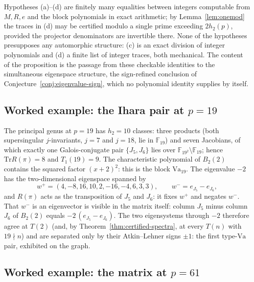 \documentclass[11pt]{amsart}
\theoremstyle{plain}
\theoremstyle{definition}
\newcommand{\F}{\mathbb{F}}
\newcommand{\Tr}{\mathrm{Tr}}
\newcommand{\Va}{\mathrm{Va}}
\providecommand{\Va}{\mathrm{Va}}
\begin{document}
	Hypotheses \textup{(a)}--\textup{(d)} are finitely many equalities between
	integers computable from $M,R,e$ and the block polynomials in exact
	arithmetic; by Lemma~\ref{lem:onemod} the traces in \textup{(d)} may be
	certified modulo a single prime exceeding $2h_2(p)$, provided the
	projector denominators are invertible there. None of the hypotheses
	presupposes any automorphic structure: \textup{(c)} is an exact division
	of integer polynomials and \textup{(d)} a finite list of integer traces,
	both mechanical. The content of the proposition is the passage from these
	checkable identities to the simultaneous eigenspace structure, the
	sign-refined conclusion of Conjecture~\ref{conj:eigenvalue-sign}, which
	no polynomial identity supplies by itself.
	
	\subsection{Worked example: the Ihara pair at $p=19$}
	\label{ss:ihara19}
	
	The principal genus at $p=19$ has $h_2=10$ classes: three products
	(both supersingular $j$-invariants, $j=7$ and $j=18$, lie in $\F_{19}$)
	and seven Jacobians, of which exactly one Galois-conjugate pair
	$\{J_5,J_6\}$ lies over $\F_{19^2}\setminus\F_{19}$; hence $\Tr R(\pi)=8$
	and $T_1(19)=9$. The characteristic polynomial of $B_2(2)$ contains the
	squared factor $(x+2)^2$: this is the block $\Va_{19}$. The eigenvalue
	$-2$ has the two-dimensional eigenspace spanned by
	\[
	w^+=(4,-8,16,10,2,-16,-4,6,3,3),\qquad
	w^-=e_{J_5}-e_{J_6},
	\]
	and $R(\pi)$ acts as the transposition of $J_5$ and $J_6$: it fixes $w^+$
	and negates $w^-$. That $w^-$ is an eigenvector is visible in the matrix
	itself: column $J_5$ minus column $J_6$ of $B_2(2)$ equals
	$-2\,(e_{J_5}-e_{J_6})$. The two eigensystems through $-2$ therefore agree
	at $T(2)$ (and, by Theorem~\ref{thm:certified-spectra}, at every $T(n)$
	with $19\nmid n$) and are separated only by their Atkin--Lehner signs
	$\pm1$: the first type-$\Va$ pair, exhibited on the graph.
	
	\subsection{Worked example: the matrix at $p=61$}
	\label{ss:p61}
	
\end{document}
